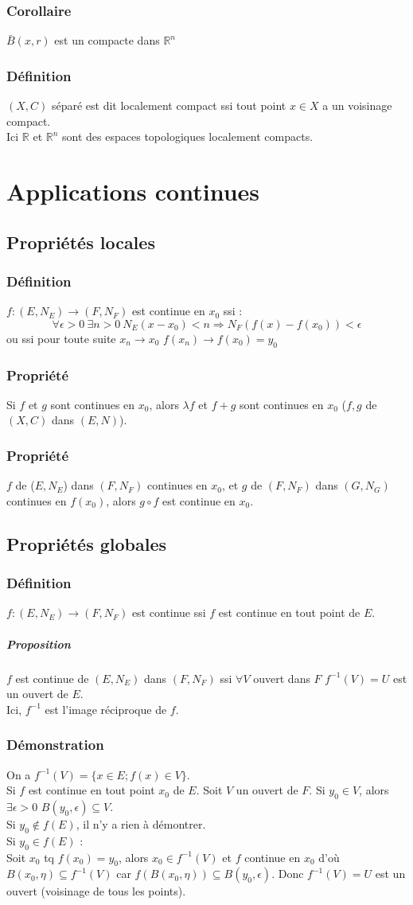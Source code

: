 \documentclass[a4paper, oneside]{report}
\newcommand{\R}{\mathbb{R}}
\newcommand{\defi}{\subsubsection{Définition}}
\newcommand{\dem}{\subsubsection{Démonstration}}
\newcommand{\propr}{\subsubsection{Propriété}}
\newcommand{\propo}{\subparagraph{Proposition}}
\newcommand{\cor}{\subsubsection{Corollaire}}
\begin{document}
\cor
$\bar{B}(x,r)$ est un compacte dans $\R^n$

\defi
$(X,C)$ séparé est dit localement compact ssi tout point $x\in X$ a un voisinage compact.\\
Ici $\R$ et $\R^n$ sont des espaces topologiques localement compacts.

\section{Applications continues}

\subsection{Propriétés locales}

\defi
$f:(E,N_E)\rightarrow (F,N_F)$ est continue en $x_0$ ssi :
$$\forall \epsilon >0~\exists n>0~N_E(x-x_0)<n\Rightarrow N_F(f(x)-f(x_0)) < \epsilon$$
ou ssi pour toute suite $x_n\rightarrow x_0$ $f(x_n)\rightarrow f(x_0)=y_0$

\propr
Si $f$ et $g$ sont continues en $x_0$, alors $\lambda f$ et $f+g$ sont continues en $x_0$ ($f,g$ de $(X,C)$ dans $(E,N)$).

\propr 
$f$ de ($E,N_E$) dans $(F,N_F)$ continues en $x_0$, et $g$ de $(F,N_F)$ dans $(G,N_G)$ continues en $f(x_0)$, alors $g\circ f$ est continue en $x_0$.

\subsection{Propriétés globales}

\defi
$f:(E,N_E)\rightarrow (F,N_F)$ est continue ssi $f$ est continue en tout point de $E$.

\propo
$f$ est continue de $(E,N_E)$ dans $(F,N_F)$ ssi $\forall V$ ouvert dans $F$ $f^{-1}(V)=U$ est un ouvert de $E$.\\
Ici, $f^{-1}$ est l'image réciproque de $f$.

\dem
On a $f^{-1}(V)=\{x\in E; f(x)\in V \}$.\\

Si $f$ est continue en tout point $x_0$ de $E$. Soit $V$ un ouvert de $F$. Si $y_0 \in V$, alors $\exists \epsilon >0$ $B(y_0,\epsilon)\subseteq V$.\\
Si $y_0 \notin f(E)$, il n'y a rien à démontrer.\\
Si $y_0\in f(E)$ :\\
Soit $x_0$ tq $f(x_0)=y_0$, alors $x_0\in f^{-1}(V)$ et $f$ continue en $x_0$ d'où $B(x_0,\eta) \subseteq f^{-1}(V)$ car $f(B(x_0,\eta))\subseteq B(y_0,\epsilon)$. Donc $f^{-1}(V)=U$ est un ouvert (voisinage de tous les points).\\
\end{document}
